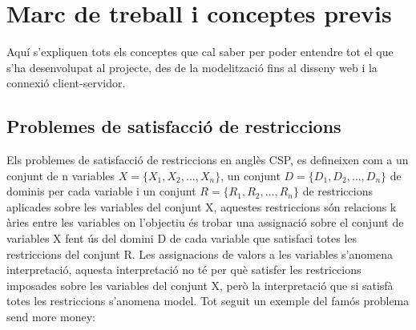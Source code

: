 


\chapter{Marc de treball i conceptes previs} %

\label{Marc de treball i conceptes previs} %

Aquí s'expliquen tots els conceptes que cal saber per poder entendre tot el que s'ha desenvolupat al projecte, des de la modelització fins al disseny web i la connexió client-servidor.
\section{Problemes de satisfacció de restriccions}
Els problemes de satisfacció de restriccions en anglès CSP, es defineixen com a un conjunt de n variables \( X = \{X_1, X_2, \ldots, X_n\} \), un conjunt \( D = \{D_1, D_2, \ldots, D_n\} \) de dominis per cada variable i un conjunt \( R = \{R_1, R_2, \ldots, R_n\} \) de restriccions aplicades sobre les variables del conjunt X, aquestes restriccions són relacions k àries entre les variables   on l'objectiu és trobar una assignació sobre el conjunt de variables X fent ús del domini D de cada variable que satisfaci totes les restriccions del conjunt R. Les assignacions de valors a les variables s'anomena interpretació, aquesta interpretació no té per què satisfer les restriccions imposades sobre les variables del conjunt X, però la interpretació que si satisfà totes les restriccions s'anomena model. Tot seguit un exemple del famós problema send more money:\\

